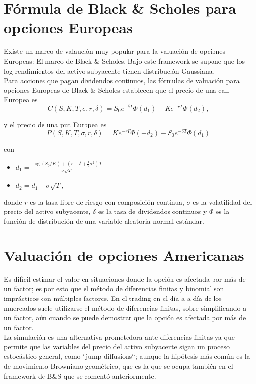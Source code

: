 \documentclass[11pt]{article}
\begin{document}
\section{Fórmula de Black \& Scholes para opciones Europeas}
	
Existe un marco de valaución muy popular para la valuación de opciones Europeas: El marco de Black \& Scholes. Bajo este framework se supone que los log-rendimientos del activo subyacente tienen distribución Gaussiana.\\

Para acciones que pagan dividendos continuos, las fórmulas de valuación para opciones Europeas de Black \& Scholes establecen que el precio de una call Europea es 
$$C(S,K,T,\sigma,r,\delta) = S_0e^{-\delta T}\Phi(d_1) - Ke^{-rT}\Phi(d_2),$$

y el precio de una put Europea es
$$P(S,K,T,\sigma,r,\delta) = Ke^{-rT}\Phi(-d_2) - S_0e^{-\delta T}\Phi(d_1)$$
	
con

\begin{itemize}
\item $d_1 = \frac{\log(S_0/K) + (r-\delta+\frac{1}{2}\sigma^2)T}{\sigma\sqrt{T}}$  
\item $d_2 = d_1 - \sigma\sqrt{T}$,
\end{itemize}

donde $r$ es la tasa libre de riesgo con 
composición continua, $\sigma$ es la volatilidad del precio del activo subyacente, $\delta$ es la tasa de dividendos continuos y $\Phi$ es la función de distribución de una variable aleatoria normal estándar.

\section{Valuación de opciones Americanas}

Es difícil estimar el valor en situaciones donde la opción es afectada por más de un factor; es por esto que el método de diferencias finitas y binomial son imprácticos con múltiples factores. En el trading en el día a a día de los muercados suele utilizarse el método de diferencias finitas, sobre-simplificando a un factor, aún cuando se puede demostrar que la opción es afectada por más de un factor.\\

La simulación es una alternativa prometedora ante diferencias finitas ya que permite que las variables del precio del activo subyacente sigan un proceso estocástico general, como ``jump diffusions``; aunque la hipótesis más común es la de movimiento 
Browniano geométrico, que es la que se ocupa también en el framework de B\&S que se comentó anteriormente.\\
\end{document}
